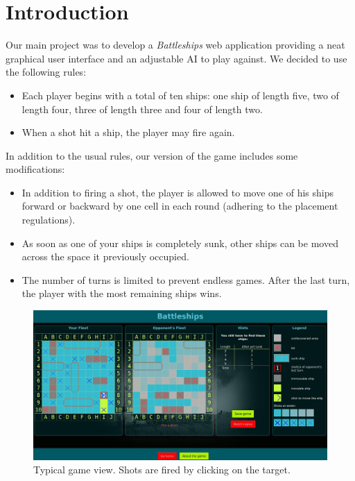 \documentclass[a4paper]{easychair}
\begin{document}
\section{Introduction}
\label{sect:intro}
Our main project was to develop a \emph{Battleships} web application providing a neat graphical user interface and an adjustable AI to play against.
We decided to use the following rules:
\begin{itemize}
 \item Each player begins with a total of ten ships: one ship of length five, two of length four, three of length three and four of length two.
 \item When a shot hit a ship, the player may fire again.
\end{itemize}

In addition to the usual rules, our version of the game includes some modifications:

\begin{itemize}
 \item
 In addition to firing a shot, the player is allowed to move one of his ships forward or backward by one cell in each round (adhering to the placement regulations).
 \item
 As soon as one of your ships is completely sunk, other ships can be moved across the space it previously occupied.
 \item
 The number of turns is limited to prevent endless games. After the last turn, the player with the most remaining ships wins.
\end{itemize}

\begin{figure}
 \centering
  \includegraphics[width=\textwidth]{play.png}
 \caption{Typical game view. Shots are fired by clicking on the target.}
\end{figure}
\end{document}
